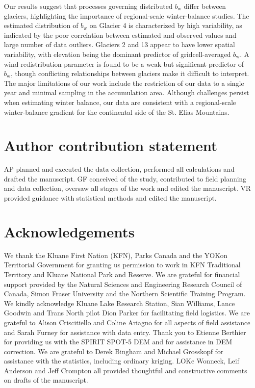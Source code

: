 \documentclass[twocolumn, letterpaper]{igs}
\begin{document}
Our results suggest that processes governing distributed $b_\mathrm{w}$ differ between glaciers, highlighting the importance of regional-scale winter-balance studies. The estimated distribution of $b_\mathrm{w}$ on Glacier 4 is characterized by high variability, as indicated by the poor correlation between estimated and observed values and large number of data outliers. Glaciers 2 and 13 appear to have lower spatial variability, with elevation being the dominant predictor of gridcell-averaged $b_\mathrm{w}$. A wind-redistribution parameter is found to be a weak but significant predictor of $b_\mathrm{w}$, though conflicting relationships between glaciers make it difficult to interpret. The major limitations of our work include the restriction of our data to a single year and minimal sampling in the accumulation area. Although challenges persist when estimating winter balance, our data are consistent with a regional-scale winter-balance gradient for the continental side of the St. Elias Mountains. 

\section{Author contribution statement}

AP planned and executed the data collection, performed all calculations and drafted the manuscript. GF conceived of the study, contributed to field planning and data collection, oversaw all stages of the work and edited the manuscript. VR provided guidance with statistical methods and edited the manuscript.

\section{Acknowledgements}

We thank the Kluane First Nation (KFN), Parks Canada and the YOKon Territorial Government for granting us permission to work in KFN Traditional Territory and Kluane National Park and Reserve. We are grateful for financial support provided by the Natural Sciences and Engineering Research Council of  Canada, Simon Fraser University and the Northern Scientific  Training  Program. We kindly acknowledge Kluane Lake Research Station, Sian Williams, Lance Goodwin and Trans North pilot Dion Parker for facilitating field logistics. We are grateful to Alison Criscitiello and Coline Ariagno for all aspects of field assistance and Sarah Furney for assistance with data entry. Thank you to Etienne Berthier for providing us with the SPIRIT SPOT-5 DEM and for assistance in DEM correction. We are grateful to Derek Bingham and Michael Grosskopf for assistance with the statistics, including ordinary kriging. LOKe Wonneck, Leif Anderson and Jeff Crompton all provided thoughtful and constructive comments on drafts of the manuscript.
\end{document}
